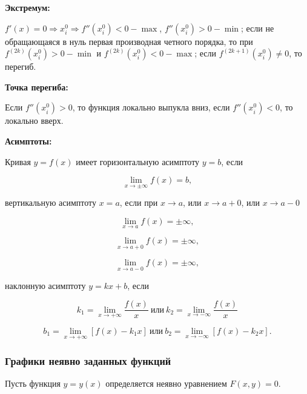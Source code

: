             \textbf{Экстремум:}

                $f' (x) = 0 \Rightarrow x^{0}_{i} \Rightarrow f'' (x^{0}_{i}) < 0 - \max$, $f'' (x^{0}_{i}) > 0 - \min$; если не обращающаяся в нуль первая производная четного порядка, то при $f^{(2 k)} (x^{0}_{i}) > 0 - \min$ и $f^{(2 k)} (x^{0}_{i}) < 0 - \max$; если $f^{(2 k + 1)} (x^{0}_{i}) \neq 0$, то перегиб.

            \textbf{Точка перегиба:}

                Если $f'' (x^{0}_{i}) > 0$, то функция локально выпукла вниз, если $f'' (x^{0}_{i}) < 0$, то локально вверх.

            \textbf{Асимптоты:}

                Кривая $y = f(x)$ имеет горизонтальную асимптоту $y = b$, если

                    \[
                        \lim_{x \rightarrow \pm \infty} f(x) = b,
                    \]

                вертикальную асимптоту $x = a$, если при $x \rightarrow a$, или $x \rightarrow a + 0$, или $x \rightarrow a - 0$

                    \[
                        \lim_{x \rightarrow a} f(x) = \pm \infty,
                    \]

                    \[
                        \lim_{x \rightarrow a + 0} f(x) = \pm \infty,
                    \]

                    \[
                        \lim_{x \rightarrow a - 0} f(x) = \pm \infty,
                    \]

                наклонную асимптоту $y = k x + b$, если

                    \[
                        k_{1} = \lim_{x \rightarrow + \infty} \frac{f(x)}{x} \: \mbox{или} \: k_{2} = \lim_{x \rightarrow - \infty} \frac{f(x)}{x}
                    \]

                    \[
                        b_{1} = \lim_{x \rightarrow + \infty} \left[ f(x) - k_{1} x \right] \: \mbox{или} \: b_{2} = \lim_{x \rightarrow - \infty} \left[ f(x) - k_{2} x \right].
                    \]

            \subsubsection{Графики неявно заданных функций}

                Пусть функция $y = y \left( x \right)$ определяется неявно уравнением $F \left( x, y \right) = 0$.\\

